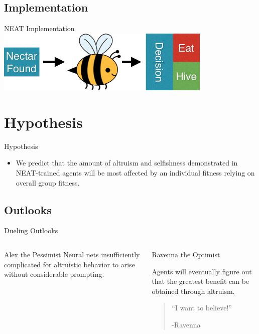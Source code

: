 \documentclass{beamer}
\begin{document}
	\subsection{Implementation}
	\begin{frame}{NEAT Implementation}
		\includegraphics[height=3cm]{bee.png}
	\end{frame}

	\section{Hypothesis}

        \begin{frame}{Hypothesis}
                \begin{itemize}
                        \item We predict that the amount of altruism and selfishness demonstrated in NEAT-trained agents will be most affected by an individual fitness relying on overall group fitness.

                \end{itemize}

        \end{frame}

	\subsection{Outlooks}
	\begin{frame}{Dueling Outlooks}
		\begin{columns}[t]

				\begin{block}{Alex the Pessimist}
						Neural nets insufficiently complicated for altruistic behavior to arise without considerable prompting.
				\end{block}

				\begin{block}{Ravenna the Optimist}
		
						Agents will eventually figure out that the greatest benefit can be obtained through altruism.
					\begin{quote}
						``I want to believe!''
						\begin{flushright}
						 	-Ravenna
						\end{flushright} 
					\end{quote}
				\end{block}

		\end{columns}
	\end{frame}
\end{document}
